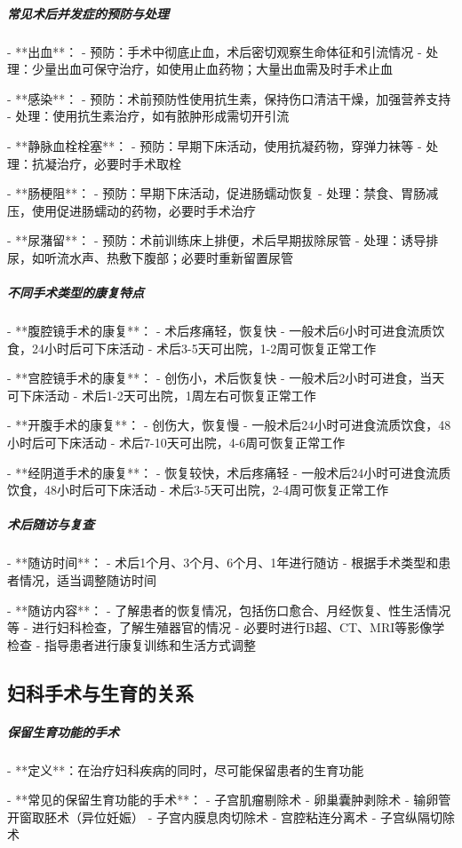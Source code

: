 \begin{enumerate}
\subparagraph{常见术后并发症的预防与处理}

- **出血**：
  - 预防：手术中彻底止血，术后密切观察生命体征和引流情况
  - 处理：少量出血可保守治疗，如使用止血药物；大量出血需及时手术止血

- **感染**：
  - 预防：术前预防性使用抗生素，保持伤口清洁干燥，加强营养支持
  - 处理：使用抗生素治疗，如有脓肿形成需切开引流

- **静脉血栓栓塞**：
  - 预防：早期下床活动，使用抗凝药物，穿弹力袜等
  - 处理：抗凝治疗，必要时手术取栓

- **肠梗阻**：
  - 预防：早期下床活动，促进肠蠕动恢复
  - 处理：禁食、胃肠减压，使用促进肠蠕动的药物，必要时手术治疗

- **尿潴留**：
  - 预防：术前训练床上排便，术后早期拔除尿管
  - 处理：诱导排尿，如听流水声、热敷下腹部；必要时重新留置尿管

\subparagraph{不同手术类型的康复特点}

- **腹腔镜手术的康复**：
  - 术后疼痛轻，恢复快
  - 一般术后6小时可进食流质饮食，24小时后可下床活动
  - 术后3-5天可出院，1-2周可恢复正常工作

- **宫腔镜手术的康复**：
  - 创伤小，术后恢复快
  - 一般术后2小时可进食，当天可下床活动
  - 术后1-2天可出院，1周左右可恢复正常工作

- **开腹手术的康复**：
  - 创伤大，恢复慢
  - 一般术后24小时可进食流质饮食，48小时后可下床活动
  - 术后7-10天可出院，4-6周可恢复正常工作

- **经阴道手术的康复**：
  - 恢复较快，术后疼痛轻
  - 一般术后24小时可进食流质饮食，48小时后可下床活动
  - 术后3-5天可出院，2-4周可恢复正常工作

\subparagraph{术后随访与复查}

- **随访时间**：
  - 术后1个月、3个月、6个月、1年进行随访
  - 根据手术类型和患者情况，适当调整随访时间

- **随访内容**：
  - 了解患者的恢复情况，包括伤口愈合、月经恢复、性生活情况等
  - 进行妇科检查，了解生殖器官的情况
  - 必要时进行B超、CT、MRI等影像学检查
  - 指导患者进行康复训练和生活方式调整

\subsection{妇科手术与生育的关系}

\subparagraph{保留生育功能的手术}

- **定义**：在治疗妇科疾病的同时，尽可能保留患者的生育功能

- **常见的保留生育功能的手术**：
  - 子宫肌瘤剔除术
  - 卵巢囊肿剥除术
  - 输卵管开窗取胚术（异位妊娠）
  - 子宫内膜息肉切除术
  - 宫腔粘连分离术
  - 子宫纵隔切除术


\end{enumerate}
